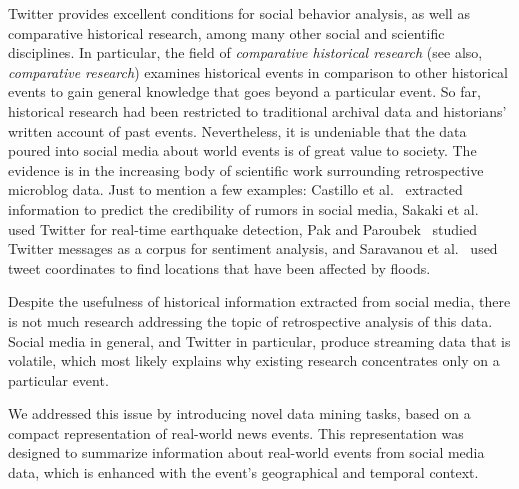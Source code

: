%
Twitter provides excellent conditions for social behavior analysis, as well as
comparative historical research, among many other social and scientific
disciplines.  
%
In particular, the field of {\em comparative historical
research} (see also, {\em comparative research}) 
examines historical events in comparison to other historical events to
gain general knowledge that goes beyond a particular event. 
%
So far, historical research had been restricted to traditional archival data and
historians' written account of past events. 
%
Nevertheless, it is undeniable that the data poured into social media about
world events is of great value to society. 
%
The evidence is in the increasing body of scientific work surrounding retrospective
microblog data.  
%
Just to mention a few examples: Castillo et al.~\cite{castillo2011information}
extracted information to predict the credibility of rumors in social media,
Sakaki et al.~\cite{Sakaki2010} used Twitter for real-time earthquake detection,
Pak and Paroubek~\cite{Pak:Twitter:2010} studied Twitter messages as a corpus
for sentiment analysis, and Saravanou et al.~\cite{Saravanou:Twitter:2015} used
tweet coordinates to find locations that have been affected by floods.


Despite the usefulness of historical information extracted from social media,
there is not much research addressing the topic of retrospective analysis of
this data.
%
Social media in general, and Twitter in particular, produce streaming data that
is volatile, which most likely explains why existing research concentrates only
on a particular event.

We addressed this issue by introducing novel data mining tasks, based on a
compact representation of real-world news events. 
%
This representation was designed to summarize information about real-world
events from social media data, which is enhanced with the event's geographical
and temporal context.


